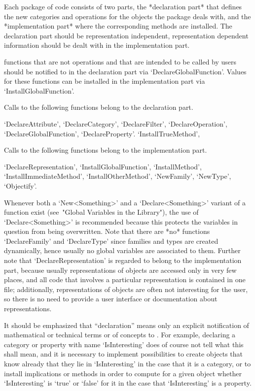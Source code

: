 
Each package of {\GAP} code consists of two parts,
the *declaration part* that defines the new categories and operations for
the objects the package deals with,
and the *implementation part* where the corresponding methods are
installed.
The declaration part should be representation independent,
representation dependent information should be dealt with in the
implementation part.

{\GAP} functions that are not operations and that are intended to be
called by users should be notified to {\GAP} in the declaration part via
`DeclareGlobalFunction'.
Values for these functions can be installed in the implementation part
via `InstallGlobalFunction'.

Calls to the following functions belong to the declaration part.

`DeclareAttribute',
`DeclareCategory',
`DeclareFilter',
`DeclareOperation',
`DeclareGlobalFunction',
`DeclareProperty'.
`InstallTrueMethod',

Calls to the following functions belong to the implementation part.

`DeclareRepresentation',
`InstallGlobalFunction',
`InstallMethod',
`InstallImmediateMethod',
`InstallOtherMethod',
`NewFamily',
`NewType',
`Objectify'.

Whenever both a `New<Something>' and a `Declare<Something>' variant
of a function exist (see~"Global Variables in the Library"),
the use of `Declare<Something>' is recommended
because this protects the variables in question from being overwritten.
Note that there are *no* functions `DeclareFamily' and `DeclareType'
since families and types are created dynamically,
hence usually no global variables are associated to them.
Further note that `DeclareRepresentation' is regarded to belong to the
implementation part,
because usually representations of objects are accessed only in very
few places, and all code that involves a particular representation
is contained in one file;
additionally, representations of objects are often not interesting
for the user, so there is no need to provide a user interface
or documentation about representations.

It should be emphasized that ``declaration'' means only an explicit
notification of mathematical or technical terms or of concepts to {\GAP}.
For example, declaring a category or property with name `IsInteresting'
does of course not tell {\GAP} what this shall mean,
and it is necessary to implement possibilities to create objects that
know already that they lie in `IsInteresting' in the case that it is a
category, or to install implications or methods in order to
compute for a given object whether `IsInteresting' is `true' or `false'
for it in the case that `IsInteresting' is a property.



